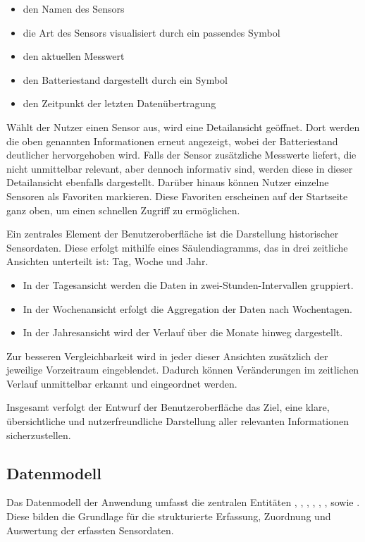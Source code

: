 	\begin{itemize}
		\item den Namen des Sensors
		\item die Art des Sensors visualisiert durch ein passendes Symbol
		\item den aktuellen Messwert
		\item den Batteriestand dargestellt durch ein Symbol
		\item den Zeitpunkt der letzten Datenübertragung
	\end{itemize}

	Wählt der Nutzer einen Sensor aus, wird eine Detailansicht geöffnet.
	Dort werden die oben genannten Informationen erneut angezeigt, wobei der Batteriestand deutlicher hervorgehoben wird.
	Falls der Sensor zusätzliche Messwerte liefert, die nicht unmittelbar relevant, aber dennoch informativ sind,
	werden diese in dieser Detailansicht ebenfalls dargestellt. Darüber hinaus können Nutzer einzelne Sensoren als Favoriten markieren.
	Diese Favoriten erscheinen auf der Startseite ganz oben, um einen schnellen Zugriff zu ermöglichen.

	Ein zentrales Element der Benutzeroberfläche ist die Darstellung historischer Sensordaten.
	Diese erfolgt mithilfe eines Säulendiagramms, das in drei zeitliche Ansichten unterteilt ist: Tag, Woche und Jahr.

	\begin{itemize}
		\item In der Tagesansicht werden die Daten in zwei-Stunden-Intervallen gruppiert.
		\item In der Wochenansicht erfolgt die Aggregation der Daten nach Wochentagen.
		\item In der Jahresansicht wird der Verlauf über die Monate hinweg dargestellt.
	\end{itemize}

	Zur besseren Vergleichbarkeit wird in jeder dieser Ansichten zusätzlich der jeweilige Vorzeitraum eingeblendet.
	Dadurch können Veränderungen im zeitlichen Verlauf unmittelbar erkannt und eingeordnet werden.

	Insgesamt verfolgt der Entwurf der Benutzeroberfläche das Ziel, eine klare,
	übersichtliche und nutzerfreundliche Darstellung aller relevanten Informationen sicherzustellen.

\subsection{Datenmodell}
\label{sec:Datenmodell}
	Das Datenmodell der Anwendung umfasst die zentralen Entitäten , , , , ,
	,  sowie . Diese bilden die Grundlage für die strukturierte Erfassung,
	Zuordnung und Auswertung der erfassten Sensordaten.

